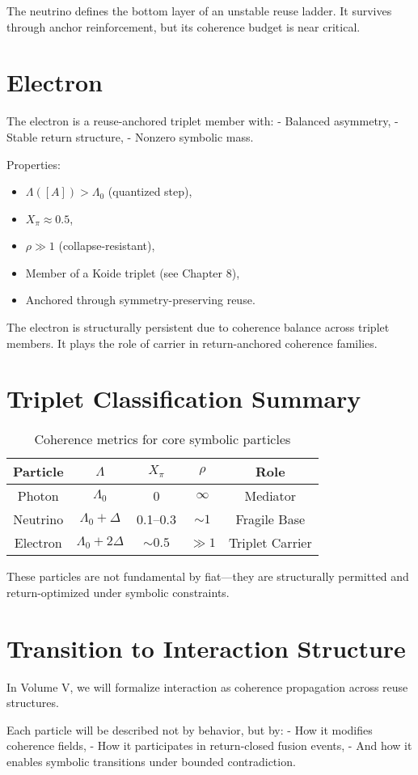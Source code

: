 The neutrino defines the bottom layer of an unstable reuse ladder. It survives through anchor reinforcement, but its coherence budget is near critical.

\section{Electron} \label{sec:electron}

The electron is a reuse-anchored triplet member with:
- Balanced asymmetry,
- Stable return structure,
- Nonzero symbolic mass.

Properties:
\begin{itemize}
  \item $\Lambda([A]) > \Lambda_0$ (quantized step),
  \item $X_\pi \approx 0.5$,
  \item $\rho \gg 1$ (collapse-resistant),
  \item Member of a Koide triplet (see Chapter 8),
  \item Anchored through symmetry-preserving reuse.
\end{itemize}

The electron is structurally persistent due to coherence balance across triplet members. It plays the role of carrier in return-anchored coherence families.

\section{Triplet Classification Summary} \label{sec:triplet-summary}

\begin{table}[h!]
\centering
\begin{tabular}{|c|c|c|c|c|}
\hline
\textbf{Particle} & $\Lambda$ & $X_\pi$ & $\rho$ & Role \\
\hline
Photon    & $\Lambda_0$      & 0        & $\infty$ & Mediator \\
Neutrino  & $\Lambda_0 + \Delta$ & 0.1–0.3 & $\sim 1$ & Fragile Base \\
Electron  & $\Lambda_0 + 2\Delta$ & $\sim 0.5$ & $\gg 1$ & Triplet Carrier \\
\hline
\end{tabular}
\caption{Coherence metrics for core symbolic particles}
\end{table}

These particles are not fundamental by fiat—they are structurally permitted and return-optimized under symbolic constraints.

\section{Transition to Interaction Structure} \label{sec:volume-v-preview}

In Volume V, we will formalize interaction as coherence propagation across reuse structures.

Each particle will be described not by behavior, but by:
- How it modifies coherence fields,
- How it participates in return-closed fusion events,
- And how it enables symbolic transitions under bounded contradiction.

